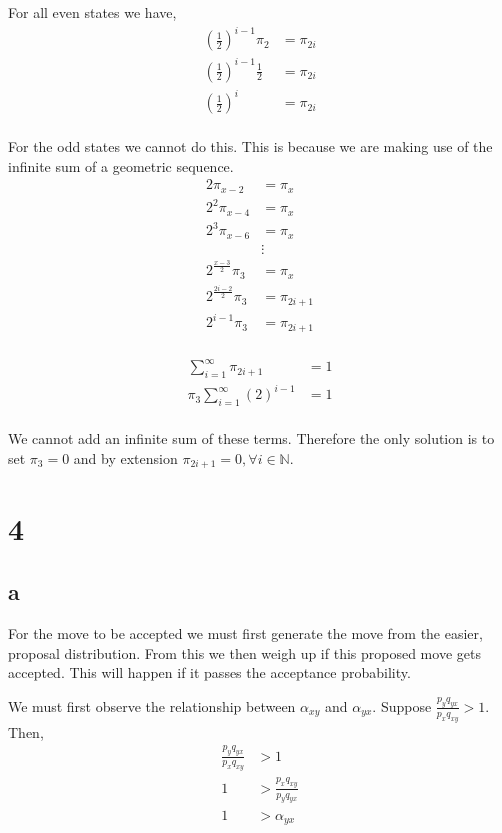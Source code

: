 \documentclass{article}
\begin{document}
For all even states we have,
\begin{align*}
    {\left(\frac{1}{2}\right)}^{i-1} \pi_{2} &= \pi_{2i} \\
    {\left(\frac{1}{2}\right)}^{i-1} \frac{1}{2} &= \pi_{2i} \\
    {\left(\frac{1}{2}\right)}^{i} &= \pi_{2i} \\
\end{align*}

For the odd states we cannot do this. This is because we are making use of the
infinite sum of a geometric sequence.
\begin{align*}
    2 \pi_{x-2} &= \pi_x \\
    2^2 \pi_{x-4} &= \pi_x \\
    2^3 \pi_{x-6} &= \pi_x \\
    &\vdots \\
    2^{\frac{x-3}{2}} \pi_{3} &= \pi_x \\
    2^{\frac{2i-2}{2}} \pi_{3} &= \pi_{2i+1} \\
    2^{i-1} \pi_{3} &= \pi_{2i+1} \\
\end{align*}

\begin{align*}
    \sum_{i=1}^{\infty} \pi_{2i+1} &= 1 \\
    \pi_{3} \sum_{i=1}^{\infty} {\left(2\right)}^{i-1} &= 1 \\
\end{align*}

We cannot add an infinite sum of these terms. Therefore the only solution
is to set $\pi_{3} = 0$ and by extension $\pi_{2i+1} = 0, \forall i \in \mathbb{N}$.

\section{4}
\subsection{a}
For the move to be accepted we must first generate the move from the easier,
proposal distribution. From this we then weigh up if this proposed move gets
accepted. This will happen if it passes the acceptance probability.

We must first observe the relationship between $\alpha_{xy}$ and $\alpha_{yx}$.
Suppose $\frac{p_y q_{yx}}{p_x q_{xy}} > 1$. Then,
\begin{align*}
    \frac{p_y q_{yx}}{p_x q_{xy}} &> 1 \\
    1 &> \frac{p_x q_{xy}}{p_y q_{yx}} \\
    1 &> \alpha_{yx} \\
\end{align*}
\end{document}
